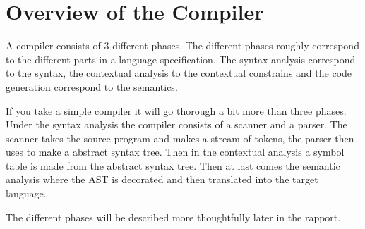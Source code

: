 \section{Overview of the Compiler}


A compiler consists of 3 different phases. The different phases roughly correspond to the different parts in a language specification. The syntax analysis correspond to the syntax, the contextual analysis to the contextual constrains and the code generation correspond to the semantics.


If you take a simple compiler it will go thorough a bit more than three phases. Under the syntax analysis the compiler consists of a scanner and a parser. The scanner takes the source program and makes a stream of tokens, the parser then uses to make a abstract syntax tree. Then in the contextual analysis a symbol table is made from the abstract syntax tree. Then at last comes the semantic analysis where the AST is decorated and then translated into the target language.

The different phases will be described more thoughtfully later in the rapport. 
